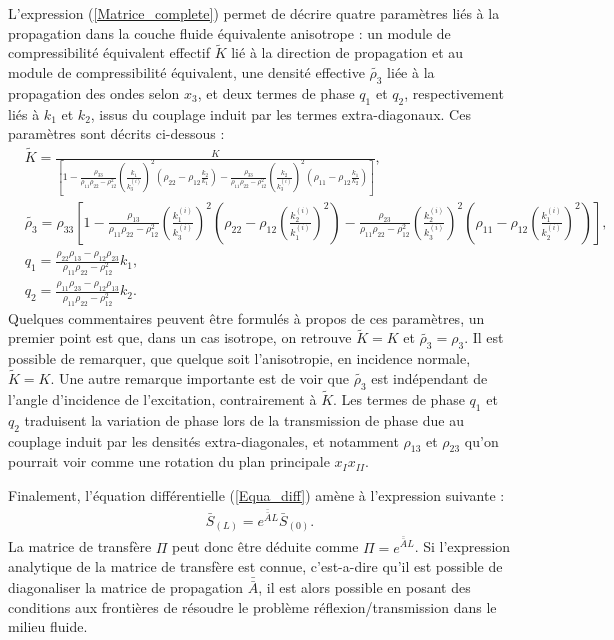 \documentclass[twoside,openright]{report}
\begin{document}
	L'expression (\ref{Matrice_complete}) permet de décrire quatre paramètres liés à la propagation dans la couche fluide équivalente anisotrope : un module de compressibilité équivalent effectif $\tilde{K}$ lié à la direction de propagation et au module de compressibilité équivalent, une densité effective $\tilde{\rho_3}$ liée à la propagation des ondes selon $x_3$, et deux termes de phase $q_1$ et $q_2$, respectivement liés à $k_1$ et $k_2$, issus du couplage induit par les termes extra-diagonaux. Ces paramètres sont décrits ci-dessous :
    \begin{align}
     &\tilde{K}=\frac{K}{[1-\frac{\rho_{33}}{\rho_{11}\rho_{22}-\rho_{12}^2}(\frac{k_1}{k_3^{(i)}})^2(\rho_{22}-\rho_{12}\frac{k_2}{k_1})-\frac{\rho_{33}}{\rho_{11}\rho_{22}-\rho_{12}^2}(\frac{k_2}{k_3^{(i)}})^2(\rho_{11}-\rho_{12}\frac{k_1}{k_2})]}\label{Ktild},\\
     &\tilde{\rho_3}=\rho_{33}[1-\frac{\rho_{13}}{\rho_{11}\rho_{22}-\rho_{12}^2}(\frac{k_1^{(i)}}{k_3^{(i)}})^2(\rho_{22}-\rho_{12}(\frac{k_2^{(i)}}{k_1^{(i)}})^2)-\frac{\rho_{23}}{\rho_{11}\rho_{22}-\rho_{12}^2}(\frac{k_2^{(i)}}{k_3^{(i)}})^2(\rho_{11}-\rho_{12}(\frac{k_1^{(i)}}{k_2^{(i)}})^2)]\label{rho3tild}, \\
	&q_{1}=\frac{\rho_{22}\rho_{13}-\rho_{12}\rho_{23}}{\rho_{11}\rho_{22}-\rho_{12}^2}k_1\label{q1},\\
    &q_{2}= \frac{\rho_{11}\rho_{23}-\rho_{12}\rho_{13}}{\rho_{11}\rho_{22}-\rho_{12}^2}k_2\label{q2}.
          \end{align}
    Quelques commentaires peuvent être formulés à propos de ces paramètres, un premier point est que, dans un cas isotrope, on retrouve  $\tilde{K}=K$ et $\tilde{\rho_3}=\rho_3$. Il est possible de remarquer, que quelque soit l'anisotropie, en incidence normale, $\tilde{K}=K$. Une autre remarque importante est de voir que $\tilde{\rho_3}$ est indépendant de l'angle d'incidence de l'excitation, contrairement à $\tilde{K}$. Les termes de phase $q_1$ et $q_2$ traduisent la variation de phase lors de la transmission de phase due au couplage induit par les densités extra-diagonales, et notamment $\rho_{13}$ et $\rho_{23}$  qu'on pourrait voir comme une rotation du plan principale $x_Ix_{II}$.
    
    Finalement, l'équation différentielle (\ref{Equa_diff}) amène à l'expression suivante : 
    \begin{align}
    \bar{S}_{(L)}=e^{\bar{\bar{A}}L}\bar{S}_{(0)}.\label{PB}
    \end{align}
    La matrice de transfère $\Pi$ peut donc être déduite comme $\Pi=e^{\bar{\bar{A}}L}$. Si l'expression analytique de la matrice de transfère est connue, c'est-a-dire qu'il est possible de diagonaliser la matrice de propagation $\bar{\bar{A}}$, il est alors possible en posant des conditions aux frontières de résoudre le problème réflexion/transmission dans le milieu fluide.
    
\end{document}
